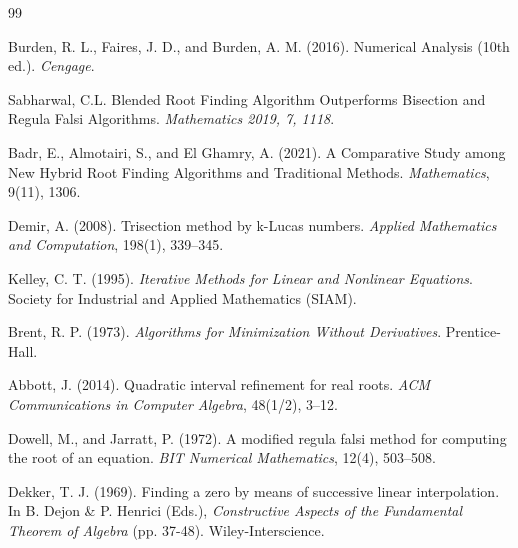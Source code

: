 \documentclass[amsmath, amssymb, aps]{revtex4-2}
\begin{document}
\begin{thebibliography}{99}

Burden, R. L., Faires, J. D., and Burden, A. M. (2016). Numerical Analysis (10th ed.). \textit{Cengage}.

Sabharwal, C.L. Blended Root Finding Algorithm Outperforms Bisection and Regula Falsi Algorithms. \textit{ Mathematics 2019, 7, 1118}.
    
Badr, E., Almotairi, S., and El Ghamry, A. (2021). A Comparative Study among New Hybrid Root Finding Algorithms and Traditional Methods. \textit{Mathematics}, 9(11), 1306.

Demir, A. (2008). Trisection method by k-Lucas numbers. \textit{Applied Mathematics and Computation}, 198(1), 339--345.

Kelley, C. T. (1995). \textit{Iterative Methods for Linear and Nonlinear Equations}. Society for Industrial and Applied Mathematics (SIAM).
    
Brent, R. P. (1973). \textit{Algorithms for Minimization Without Derivatives}. Prentice-Hall.
                    
Abbott, J. (2014). Quadratic interval refinement for real roots. \textit{ACM Communications in Computer Algebra}, 48(1/2), 3--12.
    
Dowell, M., and Jarratt, P. (1972). A modified regula falsi method for computing the root of an equation. \textit{BIT Numerical Mathematics}, 12(4), 503--508.
    
Dekker, T. J. (1969). Finding a zero by means of successive linear interpolation. In B. Dejon \& P. Henrici (Eds.), \textit{Constructive Aspects of the Fundamental Theorem of Algebra} (pp. 37-48). Wiley-Interscience.

\end{thebibliography}
\end{document}
